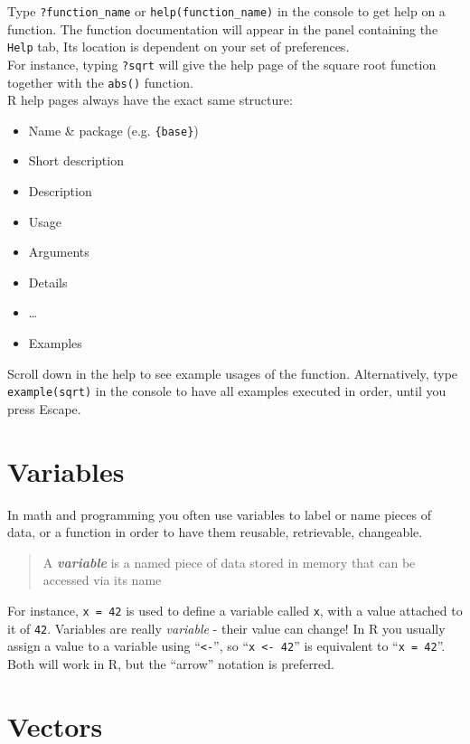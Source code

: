 \documentclass[]{book}
\providecommand{\tightlist}{%
  \setlength{\itemsep}{0pt}\setlength{\parskip}{0pt}}
\begin{document}
Type \texttt{?function\_name} or \texttt{help(function\_name)} in the console to get help on a function. The function documentation will appear in the panel containing the \texttt{Help} tab, Its location is dependent on your set of preferences.\\
For instance, typing \texttt{?sqrt} will give the help page of the square root function together with the \texttt{abs()} function.\\
R help pages always have the exact same structure:

\begin{itemize}
\tightlist
\item
  Name \& package (e.g. \texttt{\{base\}})
\item
  Short description
\item
  Description
\item
  Usage
\item
  Arguments
\item
  Details
\item
  \ldots{}
\item
  Examples
\end{itemize}

Scroll down in the help to see example usages of the function. Alternatively, type \texttt{example(sqrt)} in the console to have all examples executed in order, until you press Escape.

\hypertarget{variables}{%
\section{Variables}\label{variables}}

In math and programming you often use variables to label or name pieces of data, or a function in order to have them reusable, retrievable, changeable.

\begin{quote}
A \textbf{\emph{variable}} is a named piece of data stored in memory that can be accessed via its name
\end{quote}

For instance, \texttt{x\ =\ 42} is used to define a variable called \texttt{x}, with a value attached to it of \texttt{42}. Variables are really \emph{variable} - their value can change!
In R you usually assign a value to a variable using ``\texttt{\textless{}-}'', so ``\texttt{x\ \textless{}-\ 42}'' is equivalent to ``\texttt{x\ =\ 42}''. Both will work in R, but the ``arrow'' notation is preferred.

\hypertarget{vectors}{%
\section{Vectors}\label{vectors}}
\end{document}
